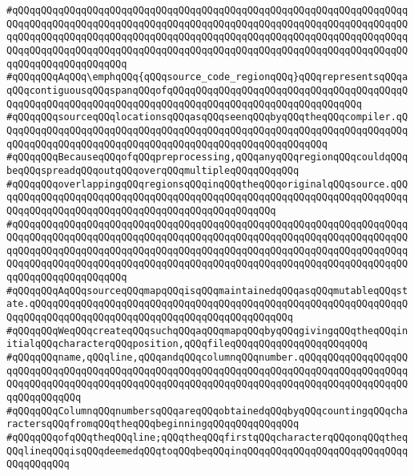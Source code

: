 \verb|#qQQqqQQqqQQqqQQqqQQqqQQqqQQqqQQqqQQqqQQqqQQqqQQqqQQqqQQqqQQqqQQqqQQqqQQqqQQqqQQqqQQqqQQqqQQqqQQqqQQqqQQqqQQqqQQqqQQqqQQqqQQqqQQqqQQqqQQqqQQqqQQqqQQqqQQqqQQqqQQqqQQqqQQqqQQqqQQqqQQqqQQqqQQqqQQqqQQqqQQqqQQqqQQqqQQqqQQqqQQqqQQqqQQqqQQqqQQqqQQqqQQqqQQqqQQqqQQqqQQqqQQqqQQqqQQqqQQqqQQqqQQqqQQqqQQqqQQqqQQq|\newline
\verb|#qQQqqQQqAqQQq\emphqQQq{qQQqsource_code_regionqQQq}qQQqrepresentsqQQqaqQQqcontiguousqQQqspanqQQqofqQQqqQQqqQQqqQQqqQQqqQQqqQQqqQQqqQQqqQQqqQQqqQQqqQQqqQQqqQQqqQQqqQQqqQQqqQQqqQQqqQQqqQQqqQQqqQQqqQQqqQQq|\newline
\verb|#qQQqqQQqsourceqQQqlocationsqQQqasqQQqseenqQQqbyqQQqtheqQQqcompiler.qQQqqQQqqQQqqQQqqQQqqQQqqQQqqQQqqQQqqQQqqQQqqQQqqQQqqQQqqQQqqQQqqQQqqQQqqQQqqQQqqQQqqQQqqQQqqQQqqQQqqQQqqQQqqQQqqQQqqQQqqQQqqQQq|\newline
\verb|#qQQqqQQqBecauseqQQqofqQQqpreprocessing,qQQqanyqQQqregionqQQqcouldqQQqbeqQQqspreadqQQqoutqQQqoverqQQqmultipleqQQqqQQqqQQq|\newline
\verb|#qQQqqQQqoverlappingqQQqregionsqQQqinqQQqtheqQQqoriginalqQQqsource.qQQqqQQqqQQqqQQqqQQqqQQqqQQqqQQqqQQqqQQqqQQqqQQqqQQqqQQqqQQqqQQqqQQqqQQqqQQqqQQqqQQqqQQqqQQqqQQqqQQqqQQqqQQqqQQqqQQqqQQq|\newline
\verb|#qQQqqQQqqQQqqQQqqQQqqQQqqQQqqQQqqQQqqQQqqQQqqQQqqQQqqQQqqQQqqQQqqQQqqQQqqQQqqQQqqQQqqQQqqQQqqQQqqQQqqQQqqQQqqQQqqQQqqQQqqQQqqQQqqQQqqQQqqQQqqQQqqQQqqQQqqQQqqQQqqQQqqQQqqQQqqQQqqQQqqQQqqQQqqQQqqQQqqQQqqQQqqQQqqQQqqQQqqQQqqQQqqQQqqQQqqQQqqQQqqQQqqQQqqQQqqQQqqQQqqQQqqQQqqQQqqQQqqQQqqQQqqQQqqQQqqQQqqQQq|\newline
\verb|#qQQqqQQqAqQQqsourceqQQqmapqQQqisqQQqmaintainedqQQqasqQQqmutableqQQqstate.qQQqqQQqqQQqqQQqqQQqqQQqqQQqqQQqqQQqqQQqqQQqqQQqqQQqqQQqqQQqqQQqqQQqqQQqqQQqqQQqqQQqqQQqqQQqqQQqqQQqqQQqqQQqqQQqqQQq|\newline
\verb|#qQQqqQQqWeqQQqcreateqQQqsuchqQQqaqQQqmapqQQqbyqQQqgivingqQQqtheqQQqinitialqQQqcharacterqQQqposition,qQQqfileqQQqqQQqqQQqqQQqqQQqqQQq|\newline
\verb|#qQQqqQQqname,qQQqline,qQQqandqQQqcolumnqQQqnumber.qQQqqQQqqQQqqQQqqQQqqQQqqQQqqQQqqQQqqQQqqQQqqQQqqQQqqQQqqQQqqQQqqQQqqQQqqQQqqQQqqQQqqQQqqQQqqQQqqQQqqQQqqQQqqQQqqQQqqQQqqQQqqQQqqQQqqQQqqQQqqQQqqQQqqQQqqQQqqQQqqQQqqQQqqQQq|\newline
\verb|#qQQqqQQqColumnqQQqnumbersqQQqareqQQqobtainedqQQqbyqQQqcountingqQQqcharactersqQQqfromqQQqtheqQQqbeginningqQQqqQQqqQQqqQQq|\newline
\verb|#qQQqqQQqofqQQqtheqQQqline;qQQqtheqQQqfirstqQQqcharacterqQQqonqQQqtheqQQqlineqQQqisqQQqdeemedqQQqtoqQQqbeqQQqinqQQqqQQqqQQqqQQqqQQqqQQqqQQqqQQqqQQqqQQq|\newline
